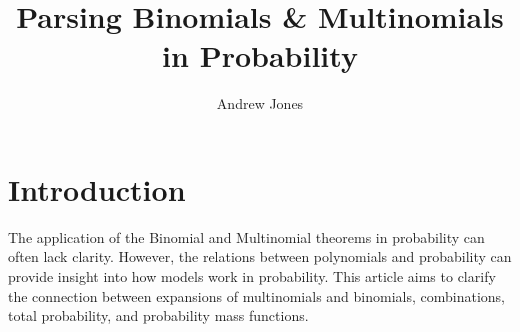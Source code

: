 \documentclass{article}
\title{Parsing Binomials \& Multinomials in Probability}
\author{Andrew Jones}\date{}
\theoremstyle{plain}
\theoremstyle{definition}
\theoremstyle{remark}
\begin{document}
\maketitle



\section*{Introduction}
The application of the Binomial and Multinomial theorems in probability can often lack clarity. However, the relations between polynomials and probability can provide insight into how models work in probability. This article aims to clarify the connection between expansions of multinomials and binomials, combinations, total probability, and probability mass functions.

\end{document}
